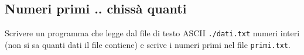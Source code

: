 
\subsection{Numeri primi .. chiss\`a quanti}

Scrivere un programma che legge dal file di testo ASCII \texttt{./dati.txt} numeri interi (non si sa quanti dati il file contiene) e scrive i numeri primi nel file \texttt{primi.txt}. 

